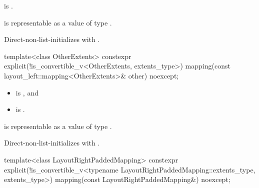 \begin{itemdescr}
\pnum
\constraints
{} is .

\pnum
\expects
{} is representable as
a value of type .

\pnum
\effects
Direct-non-list-initializes  with .
\end{itemdescr}

%
\begin{itemdecl}
template<class OtherExtents>
  constexpr explicit(!is_convertible_v<OtherExtents, extents_type>)
    mapping(const layout_left::mapping<OtherExtents>& other) noexcept;
\end{itemdecl}

\begin{itemdescr}
\pnum
\constraints
\begin{itemize}
\item
{} is , and
\item
{} is .
\end{itemize}

\pnum
\expects
{} is representable as
a value of type .

\pnum
\effects
Direct-non-list-initializes  with .
\end{itemdescr}

%
\begin{itemdecl}
template<class LayoutRightPaddedMapping>
  constexpr explicit(!is_convertible_v<typename LayoutRightPaddedMapping::extents_type,
                                       extents_type>)
    mapping(const LayoutRightPaddedMapping&) noexcept;
\end{itemdecl}

